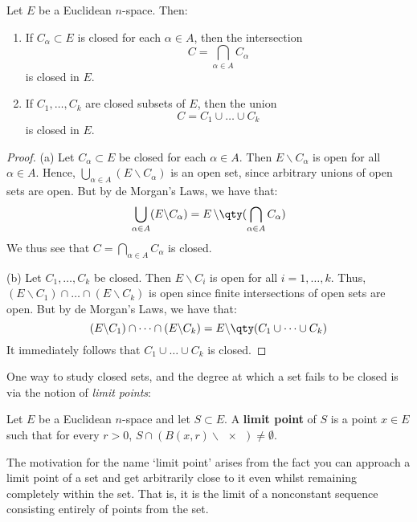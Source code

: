 \begin{proposition}
  Let \( E \) be a Euclidean \( n \)-space. Then:
  \begin{enumerate}[label=(\alph*)]
  \item If \( C_\alpha\subset E \) is closed for each \( \alpha\in A \), then the intersection
    \[ C=\bigcap_{\alpha\in A}C_\alpha \]
    is closed in \( E \).
  \item If \( C_1,\dots,C_k \) are closed subsets of \( E \), then the union
    \[ C=C_1\cup\dots\cup C_k \]
    is closed in \( E \).
  \end{enumerate}
\end{proposition}
\begin{proof}
  (a) Let \( C_\alpha\subset E \) be closed for each \( \alpha\in A \). Then \( E\backslash C_\alpha \) is open for all \( \alpha\in A \). Hence, \( \bigcup_{\alpha\in A}(E\backslash C_\alpha) \) is an open set, since arbitrary unions of open sets are open. But by de Morgan's Laws, we have that:
  \[ \bigcup_{\alpha\in A}(E\backslash C_\alpha)=E\,\backslash\qty(\bigcap_{\alpha\in A}C_\alpha) \]
  We thus see that \( C=\bigcap_{\alpha\in A}C_\alpha \) is closed.

  \vspace{3mm}

  (b) Let \( C_1,\dots, C_k \) be closed. Then \( E\backslash C_i \) is open for all \( i=1,\dots,k \). Thus, \( (E\backslash C_1)\cap\dots\cap(E\backslash C_k) \) is open since finite intersections of open sets are open. But by de Morgan's Laws, we have that:
  \[ (E\backslash C_1)\cap\dots\cap(E\backslash C_k)=E\backslash\qty(C_1\cup\dots\cup C_k) \]
  It immediately follows that \( C_1\cup\dots\cup C_k \) is closed.
\end{proof}

One way to study closed sets, and the degree at which a set fails to be closed is via the notion of \emph{limit points}:

\begin{definition}
  Let \( E \) be a Euclidean \( n \)-space and let \( S\subset E \). A \textbf{limit point} of \( S \) is a point \( x\in E \) such that for every \( r>0 \), \( S\cap (B(x,r)\backslash\qty{x})\neq\emptyset \).
\end{definition}

The motivation for the name `limit point' arises from the fact you can approach a limit point of a set and get arbitrarily close to it even whilst remaining completely within the set. That is, it is the limit of a nonconstant sequence consisting entirely of points from the set.

